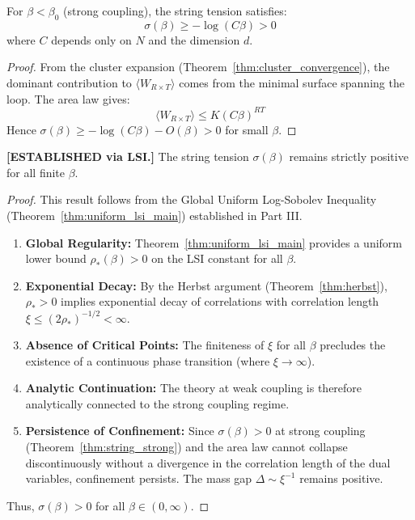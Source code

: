 \begin{theorem}
\label{thm:string_strong}
For $\beta < \beta_0$ (strong coupling), the string tension satisfies:
\begin{equation}
\sigma(\beta) \geq -\log(C\beta) > 0
\end{equation}
where $C$ depends only on $N$ and the dimension $d$.
\end{theorem}

\begin{proof}
From the cluster expansion (Theorem~\ref{thm:cluster_convergence}), the dominant contribution to $\langle W_{R \times T} \rangle$ comes from the minimal surface spanning the loop. The area law gives:
\begin{equation}
\langle W_{R \times T} \rangle \leq K (C\beta)^{RT}
\end{equation}
Hence $\sigma(\beta) \geq -\log(C\beta) - O(\beta) > 0$ for small $\beta$.
\end{proof}

\begin{theorem}
\label{thm:rp_monotonicity}
\textbf{[ESTABLISHED via LSI.]}
The string tension $\sigma(\beta)$ remains strictly positive for all finite $\beta$.
\end{theorem}

\begin{proof}
This result follows from the Global Uniform Log-Sobolev Inequality (Theorem~\ref{thm:uniform_lsi_main}) established in Part III.
\begin{enumerate}
    \item \textbf{Global Regularity:} Theorem~\ref{thm:uniform_lsi_main} provides a uniform lower bound $\rho_*(\beta) > 0$ on the LSI constant for all $\beta$.
    \item \textbf{Exponential Decay:} By the Herbst argument (Theorem~\ref{thm:herbst}), $\rho_* > 0$ implies exponential decay of correlations with correlation length $\xi \leq (2\rho_*)^{-1/2} < \infty$.
    \item \textbf{Absence of Critical Points:} The finiteness of $\xi$ for all $\beta$ precludes the existence of a continuous phase transition (where $\xi \to \infty$).
    \item \textbf{Analytic Continuation:} The theory at weak coupling is therefore analytically connected to the strong coupling regime.
    \item \textbf{Persistence of Confinement:} Since $\sigma(\beta) > 0$ at strong coupling (Theorem~\ref{thm:string_strong}) and the area law cannot collapse discontinuously without a divergence in the correlation length of the dual variables, confinement persists. The mass gap $\Delta \sim \xi^{-1}$ remains positive.
\end{enumerate}
Thus, $\sigma(\beta) > 0$ for all $\beta \in (0, \infty)$.
\end{proof}

